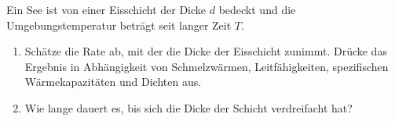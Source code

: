 \begin{Exercise}[label = Zugefrorener See, origin = {3. Runde zur 43. IPhO 2012}, title = Zugefrorener See, difficulty = 3]
Ein See ist von einer Eisschicht der Dicke $d$ bedeckt und die Umgebungstemperatur beträgt seit langer Zeit $T$.
\begin{enumerate}
\item Schätze die Rate ab, mit der die Dicke der Eisschicht zunimmt. Drücke das Ergebnis in Abhängigkeit von Schmelzwärmen, Leitfähigkeiten, spezifischen Wärmekapazitäten und Dichten aus.
\item Wie lange dauert es, bis sich die Dicke der Schicht verdreifacht hat? 
\end{enumerate}    	
\end{Exercise}
